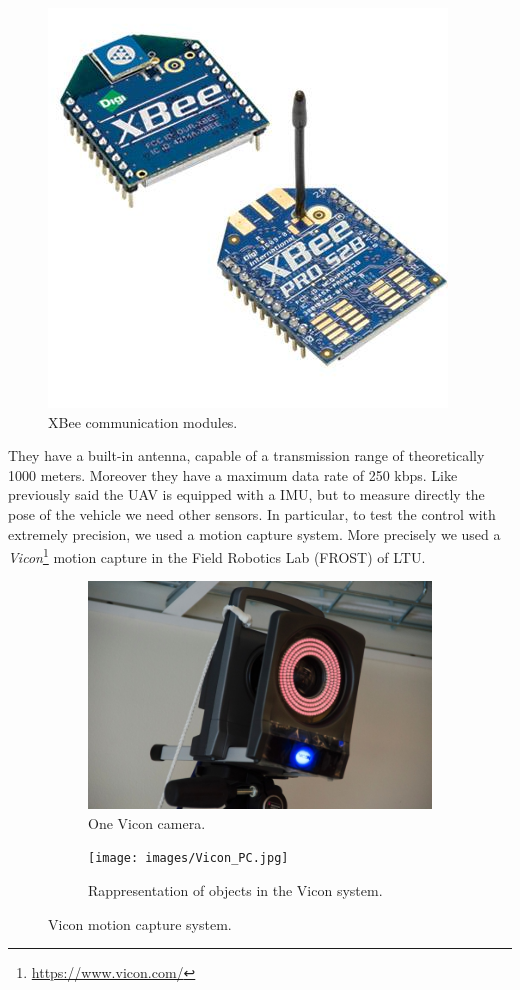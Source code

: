 \begin{figure}[h]
	\centering
	\includegraphics[scale = 0.55]{./images/XBee.jpg}
	\caption{XBee communication modules.}
	\label{fig:XBee}
\end{figure}

\noindent They have a built-in antenna, capable of a transmission range of theoretically 1000 meters. Moreover they have a maximum data rate of 250 kbps. Like previously said the UAV is equipped with a IMU, but to measure directly the pose of the vehicle we need other sensors. In particular, to test the control with extremely precision, we used a motion capture system. More precisely we used a \textit{Vicon}\footnote{\url{https://www.vicon.com/}} motion capture in the Field Robotics Lab (FROST) of LTU.

\begin{figure}[h]
	\centering
	\begin{subfigure}[t]{0.49\textwidth}
		\centering
		\includegraphics[scale = 0.25]{images/Vicon_camera.jpg}
		\caption{One Vicon camera.}
		\label{subfig:vicon1}
	\end{subfigure} 
	\begin{subfigure}[t]{0.49\textwidth}
		\centering
		\texttt{[image: images/Vicon\_PC.jpg]}
		\caption{Rappresentation of objects in the Vicon system.}
		\label{subfig:vicon2}
	\end{subfigure}
	\caption{Vicon motion capture system.}
	\label{fig:vicon}
\end{figure}

